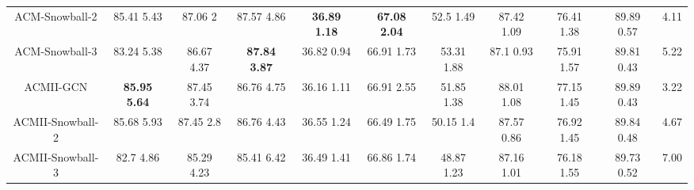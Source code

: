 \documentclass{article}
\newcommand{\0}{{\boldsymbol{0}}}
\newcommand{\6}{{\partial}}
\newcommand{\8}{{\infty}}
\newcommand{\4}{{\nabla}}
\begin{document}
\begin{table}[htbp]
{\begin{tabular}{c|ccccccccc|c}
    ACM-Snowball-2 & 85.41  5.43 & 87.06  2 & 87.57  4.86 & \cellcolor[rgb]{ .816,  .808,  .808}\textbf{36.89  1.18} & \cellcolor[rgb]{ .816,  .808,  .808}\textbf{67.08  2.04} & 52.5  1.49 & 87.42  1.09 & 76.41  1.38 & 89.89  0.57 & 4.11 \\
    ACM-Snowball-3 & 83.24  5.38 & 86.67  4.37 & \cellcolor[rgb]{ .816,  .808,  .808}\textbf{87.84  3.87} & 36.82  0.94 & 66.91  1.73 & 53.31  1.88 & 87.1  0.93 & 75.91  1.57 & 89.81  0.43 & 5.22 \\
    ACMII-GCN & \cellcolor[rgb]{ .816,  .808,  .808}\textbf{85.95  5.64} & 87.45  3.74 & 86.76  4.75 & 36.16  1.11 & 66.91  2.55 & 51.85  1.38 & 88.01  1.08 & 77.15  1.45 & 89.89  0.43 & 3.22 \\
    ACMII-Snowball-2 & 85.68  5.93 & 87.45  2.8 & 86.76  4.43 & 36.55  1.24 & 66.49  1.75 & 50.15  1.4 & 87.57  0.86 & 76.92  1.45 & 89.84  0.48 & 4.67 \\
    ACMII-Snowball-3 & 82.7  4.86 & 85.29  4.23 & 85.41  6.42 & 36.49  1.41 & 66.86  1.74 & 48.87  1.23 & 87.16  1.01 & 76.18  1.55 & 89.73  0.52 & 7.00 \\
    \bottomrule
    \bottomrule
    \end{tabular}}
  \label{tab:performance_comparison_fixed_splits}\end{table} \begin{table}[htbp]
  \centering
  \caption{Hyperparameters for FAGCN and ACM-GNNs on fixed splits}
\end{table}
\end{document}
